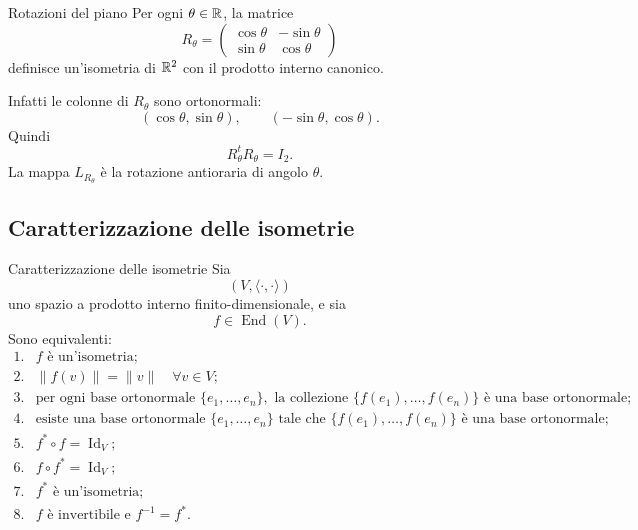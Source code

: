 \documentclass[a4paper]{article}
\begin{document}
\begin{snippetexample}{Rotazioni del piano}
    Per ogni \(\theta\in\mathbb{R}\), la matrice
    \[
        R_\theta=
        \begin{pmatrix}
            \cos\theta & -\sin\theta\\
            \sin\theta & \cos\theta
        \end{pmatrix}
    \]
    definisce un'isometria di \(\mathbb{R}^2\) con il prodotto interno canonico.

    Infatti le colonne di \(R_\theta\) sono ortonormali:
    \[
        (\cos\theta,\sin\theta),
        \qquad
        (-\sin\theta,\cos\theta).
    \]
    Quindi
    \[
        R_\theta^tR_\theta=I_2.
    \]
    La mappa \(L_{R_\theta}\) è la rotazione antioraria di angolo \(\theta\).
\end{snippetexample}

\subsection{Caratterizzazione delle isometrie}

\begin{snippettheorem}{Caratterizzazione delle isometrie}
    Sia
    \[
        (V,\langle\cdot,\cdot\rangle)
    \]
    uno spazio a prodotto interno finito-dimensionale, e sia
    \[
        f\in\operatorname{End}(V).
    \]
    Sono equivalenti:
    \[
        \begin{array}{ll}
            \text{1.} & f \text{ è un'isometria};\\[1mm]
            \text{2.} & \|f(v)\|=\|v\| \quad \forall v\in V;\\[1mm]
            \text{3.} & \text{per ogni base ortonormale } \{e_1,\ldots,e_n\},
            \text{ la collezione }
            \{f(e_1),\ldots,f(e_n)\}
            \text{ è una base ortonormale};\\[1mm]
            \text{4.} & \text{esiste una base ortonormale } \{e_1,\ldots,e_n\}
            \text{ tale che }
            \{f(e_1),\ldots,f(e_n)\}
            \text{ è una base ortonormale};\\[1mm]
            \text{5.} & f^*\circ f=\operatorname{Id}_V;\\[1mm]
            \text{6.} & f\circ f^*=\operatorname{Id}_V;\\[1mm]
            \text{7.} & f^* \text{ è un'isometria};\\[1mm]
            \text{8.} & f \text{ è invertibile e } f^{-1}=f^*.
        \end{array}
    \]
\end{snippettheorem}
\end{document}
